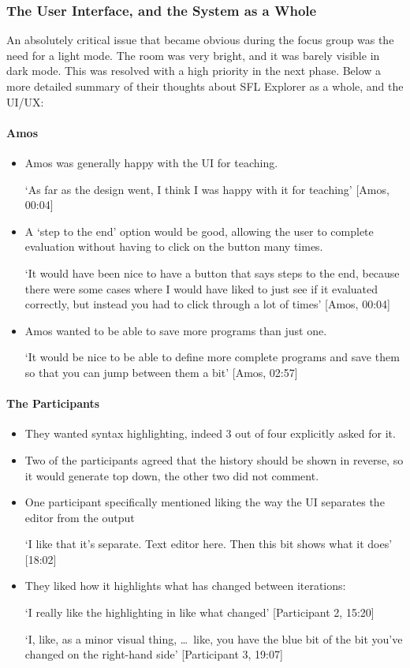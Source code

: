 \subsubsection{The User Interface, and the System as a Whole}
An absolutely critical issue that became obvious during the focus group was the need for a light mode. The room was very bright, and it was barely visible in dark mode. This was resolved with a high priority in the next phase. 
Below a more detailed summary of their thoughts about SFL Explorer as a whole, and the UI/UX:

\paragraph{Amos}\begin{itemize}
    \item Amos was generally happy with the UI for teaching.
    
    `As far as the design went, I think I was happy with it for teaching' [Amos, 00:04]
    \item A `step to the end' option would be good, allowing the user to complete evaluation without having to click on the button many times.
    
    `It would have been nice to have a button that says steps to the end, because there were some cases where I would have liked to just see if it evaluated correctly, but
    instead you had to click through a lot of times' [Amos, 00:04]
    \item Amos wanted to be able to save more programs than just one.
    
    `It would be nice to be able to define more complete programs and save them so that you can jump between them a bit' [Amos, 02:57]
\end{itemize}

\paragraph{The Participants}\begin{itemize}
    \item They wanted syntax highlighting, indeed 3 out of four explicitly asked for it. 

    \item Two of the participants agreed that the history should be shown in reverse, so it would generate top down, the other two did not comment. 
    \item One participant specifically mentioned liking the way the UI separates the editor from the output
    
    `I like that it's separate. Text editor here. Then this bit shows what it does' [18:02]
    \item They liked how it highlights what has changed between iterations:
    
    `I really like the highlighting in like what changed' [Participant 2, 15:20]
    
    `I, like, as a minor visual thing, \dots\ like, you have the blue bit of the bit you've changed on the right-hand side' [Participant 3, 19:07]
\end{itemize}


